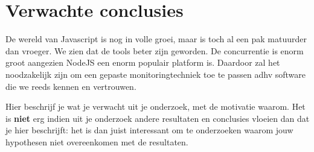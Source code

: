 \section{Verwachte conclusies}
\label{sec:verwachte_conclusies}

De wereld van Javascript is nog in volle groei, maar is toch al een pak matuurder dan vroeger. We zien dat de tools beter zijn geworden. De concurrentie is enorm groot aangezien NodeJS een enorm populair platform is. Daardoor zal het noodzakelijk zijn om een gepaste monitoringtechniek toe te passen adhv software die we reeds kennen en vertrouwen. 

Hier beschrijf je wat je verwacht uit je onderzoek, met de motivatie waarom. Het is \textbf{niet} erg indien uit je onderzoek andere resultaten en conclusies vloeien dan dat je hier beschrijft: het is dan juist interessant om te onderzoeken waarom jouw hypothesen niet overeenkomen met de resultaten.

